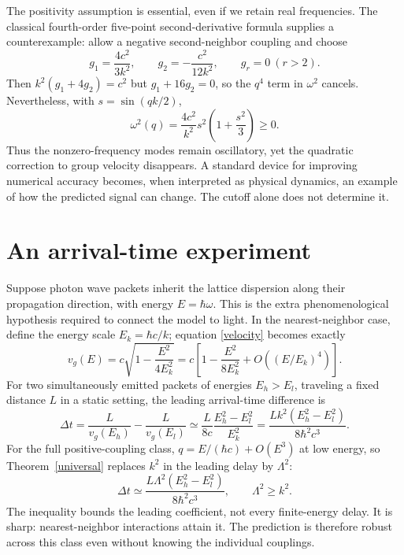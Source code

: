 \documentclass[11pt]{article}
\begin{document}
The positivity assumption is essential, even if we retain real frequencies. The classical fourth-order five-point second-derivative formula \cite[Eq.~3.4.23]{nist} supplies a counterexample: allow a negative second-neighbor coupling and choose
\begin{equation}
g_1=\frac{4c^2}{3k^2},\qquad
g_2=-\frac{c^2}{12k^2},\qquad g_r=0\ (r>2).
\end{equation}
Then $k^2(g_1+4g_2)=c^2$ but $g_1+16g_2=0$, so the $q^4$ term in $\omega^2$ cancels. Nevertheless, with $s=\sin(qk/2)$,
\begin{equation}
\omega^2(q)=\frac{4c^2}{k^2}s^2\left(1+\frac{s^2}{3}\right)\geq0.
\end{equation}
Thus the nonzero-frequency modes remain oscillatory, yet the quadratic correction to group velocity disappears. A standard device for improving numerical accuracy becomes, when interpreted as physical dynamics, an example of how the predicted signal can change. The cutoff alone does not determine it.

\section{An arrival-time experiment}
Suppose photon wave packets inherit the lattice dispersion along their propagation direction, with energy $E=\hbar\omega$. This is the extra phenomenological hypothesis required to connect the model to light. In the nearest-neighbor case, define the energy scale $E_k=\hbar c/k$; equation \eqref{velocity} becomes exactly
\begin{equation}
v_g(E)=c\sqrt{1-\frac{E^2}{4E_k^2}}
=c\left[1-\frac{E^2}{8E_k^2}+O\!\left((E/E_k)^4\right)\right].
\end{equation}
For two simultaneously emitted packets of energies $E_h>E_l$, traveling a fixed distance $L$ in a static setting, the leading arrival-time difference is
\begin{equation}\label{delay}
\Delta t=\frac{L}{v_g(E_h)}-\frac{L}{v_g(E_l)}
\simeq\frac{L}{8c}\frac{E_h^2-E_l^2}{E_k^2}
=\frac{Lk^2(E_h^2-E_l^2)}{8\hbar^2c^3}.
\end{equation}
For the full positive-coupling class, $q=E/(\hbar c)+O(E^3)$ at low energy, so Theorem~\ref{universal} replaces $k^2$ in the leading delay by $\Lambda^2$:
\begin{equation}\label{classdelay}
\Delta t\simeq\frac{L\Lambda^2(E_h^2-E_l^2)}{8\hbar^2c^3},
\qquad \Lambda^2\geq k^2.
\end{equation}
The inequality bounds the leading coefficient, not every finite-energy delay. It is sharp: nearest-neighbor interactions attain it. The prediction is therefore robust across this class even without knowing the individual couplings.
\end{document}
